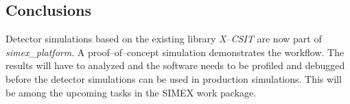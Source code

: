 \subsection{Conclusions}
Detector simulations based on the existing library \textit{X--CSIT} are now part
of \textit{simex\_platform}.
A proof--of--concept simulation demonstrates the workflow. The results will have
to analyzed and the software needs to be profiled and debugged before the
detector simulations can be used in production simulations. This will be among
the upcoming tasks in the SIMEX work package.
